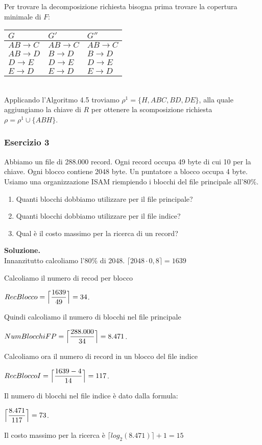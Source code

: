  \noindent Per trovare la decomposizione richiesta bisogna prima trovare la copertura minimale di $F$:\\
 
 \begin{tabular}{l|l|l}
 $G$ & $G'$ & $G''$\\
 \hline
 $AB \rightarrow C$ & $AB \rightarrow C$ & $AB \rightarrow C$\\
 $AB \rightarrow D$ & $B \rightarrow D$ & $B \rightarrow D$\\
 $D \rightarrow E$ & $D \rightarrow E$ & $D \rightarrow E$\\
 $E \rightarrow D$ & $E \rightarrow D$ & $E \rightarrow D$\\
 \end{tabular}\\
 
 \noindent Applicando l'Algoritmo 4.5 troviamo $\rho^1= \{H, ABC, BD, DE\}$, alla quale aggiungiamo la chiave di $R$
 per ottenere la scomposizione richiesta $\rho = \rho^1 \cup \{ABH\}$.
 
\subsubsection{Esercizio 3}
Abbiamo un file di 288.000 record. Ogni record occupa 49 byte di cui 10 per la chiave. Ogni blocco contiene 2048 byte.
Un puntatore a blocco occupa 4 byte. Usiamo una organizzazione ISAM riempiendo i blocchi del file principale all'$80\%$.
\begin{enumerate}
 \item  Quanti blocchi dobbiamo utilizzare per il file principale? 
 \item Quanti blocchi dobbiamo utilizzare per il file indice?
 \item Qual è il costo massimo per la ricerca di un record? 
\end{enumerate}

\noindent\textbf{\fontsize{14pt}{1em}Soluzione.}\\
Innanzitutto calcoliamo l'$80\%$ di 2048. $\lceil2048 \cdot 0,8\rceil = 1639$

Calcoliamo il numero di recod per blocco
\begin{center}
 $RecBlocco = \Bigl\lceil \dfrac{1639}{49} \Bigr\rceil = 34$.\\
\end{center}
Quindi calcoliamo il numero di blocchi nel file principale
\begin{center}
 $NumBlocchiFP = \Bigl\lceil \dfrac{288.000}{34} \Bigr\rceil = 8.471$.\\
\end{center}
Calcoliamo ora il numero di record in un blocco del file indice
\begin{center}
 $RecBloccoI = \Bigl\lceil \dfrac{1639-4}{14} \Bigr\rceil = 117$.\\
\end{center}
Il numero di blocchi nel file indice è dato dalla formula:
\begin{center}
 $\Bigl\lceil \dfrac{8.471}{117} \Bigr\rceil = 73$.
\end{center}
Il costo massimo per la ricerca è $\lceil log_2(8.471)\rceil + 1 = 15$
  
 





